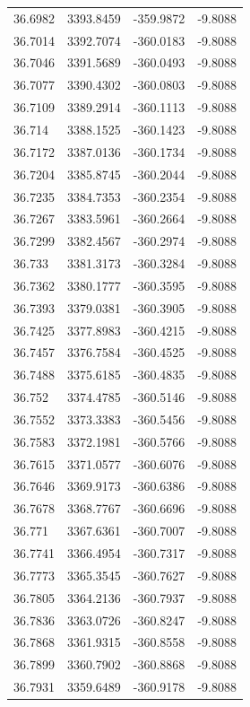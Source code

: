 \begin{table}[H]
\begin{tabular}{llll}
36.6982 & 3393.8459 & -359.9872 & -9.8088 \\
36.7014 & 3392.7074 & -360.0183 & -9.8088 \\
36.7046 & 3391.5689 & -360.0493 & -9.8088 \\
36.7077 & 3390.4302 & -360.0803 & -9.8088 \\
36.7109 & 3389.2914 & -360.1113 & -9.8088 \\
36.714 & 3388.1525 & -360.1423 & -9.8088 \\
36.7172 & 3387.0136 & -360.1734 & -9.8088 \\
36.7204 & 3385.8745 & -360.2044 & -9.8088 \\
36.7235 & 3384.7353 & -360.2354 & -9.8088 \\
36.7267 & 3383.5961 & -360.2664 & -9.8088 \\
36.7299 & 3382.4567 & -360.2974 & -9.8088 \\
36.733 & 3381.3173 & -360.3284 & -9.8088 \\
36.7362 & 3380.1777 & -360.3595 & -9.8088 \\
36.7393 & 3379.0381 & -360.3905 & -9.8088 \\
36.7425 & 3377.8983 & -360.4215 & -9.8088 \\
36.7457 & 3376.7584 & -360.4525 & -9.8088 \\
36.7488 & 3375.6185 & -360.4835 & -9.8088 \\
36.752 & 3374.4785 & -360.5146 & -9.8088 \\
36.7552 & 3373.3383 & -360.5456 & -9.8088 \\
36.7583 & 3372.1981 & -360.5766 & -9.8088 \\
36.7615 & 3371.0577 & -360.6076 & -9.8088 \\
36.7646 & 3369.9173 & -360.6386 & -9.8088 \\
36.7678 & 3368.7767 & -360.6696 & -9.8088 \\
36.771 & 3367.6361 & -360.7007 & -9.8088 \\
36.7741 & 3366.4954 & -360.7317 & -9.8088 \\
36.7773 & 3365.3545 & -360.7627 & -9.8088 \\
36.7805 & 3364.2136 & -360.7937 & -9.8088 \\
36.7836 & 3363.0726 & -360.8247 & -9.8088 \\
36.7868 & 3361.9315 & -360.8558 & -9.8088 \\
36.7899 & 3360.7902 & -360.8868 & -9.8088 \\
36.7931 & 3359.6489 & -360.9178 & -9.8088 \\

\end{tabular}
\end{table}
